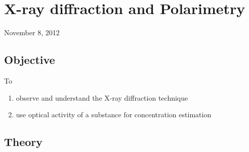 \chapter{X-ray diffraction and Polarimetry}
\begin{flushright}
November 8, 2012
\end{flushright}
\section{Objective}
To
	\begin{enumerate}
		\item observe and understand the X-ray diffraction technique
		\item use optical activity of a substance for concentration estimation
	\end{enumerate}

\section{Theory}
